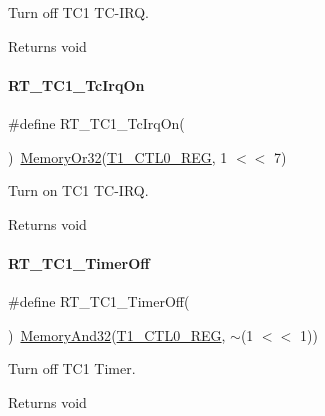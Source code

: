 Turn off T\+C1 T\+C-\/\+I\+RQ. 

\begin{DoxyReturn}{Returns}
void 
\end{DoxyReturn}
\mbox{\label{a00080_adbef657c94c7b32f07e4210fbf7f4745}} 
\paragraph{\texorpdfstring{R\+T\+\_\+\+T\+C1\+\_\+\+Tc\+Irq\+On}{RT\_TC1\_TcIrqOn}}
{\footnotesize\ttfamily \#define R\+T\+\_\+\+T\+C1\+\_\+\+Tc\+Irq\+On(\begin{DoxyParamCaption}{ }\end{DoxyParamCaption})~\mbox{\hyperlink{a00026_a27874a97deab7cecdde5ddecf466e31e}{Memory\+Or32}}(\mbox{\hyperlink{a00026_a55600694c3c73a1019f78d306f474fa1}{T1\+\_\+\+C\+T\+L0\+\_\+\+R\+EG}}, 1 $<$$<$ 7)}



Turn on T\+C1 T\+C-\/\+I\+RQ. 

\begin{DoxyReturn}{Returns}
void 
\end{DoxyReturn}
\mbox{\label{a00080_a1bccbc833364c4f1c6ce63a758136817}} 
\paragraph{\texorpdfstring{R\+T\+\_\+\+T\+C1\+\_\+\+Timer\+Off}{RT\_TC1\_TimerOff}}
{\footnotesize\ttfamily \#define R\+T\+\_\+\+T\+C1\+\_\+\+Timer\+Off(\begin{DoxyParamCaption}{ }\end{DoxyParamCaption})~\mbox{\hyperlink{a00026_ad87cedffcaadc51db22594fce55173d4}{Memory\+And32}}(\mbox{\hyperlink{a00026_a55600694c3c73a1019f78d306f474fa1}{T1\+\_\+\+C\+T\+L0\+\_\+\+R\+EG}}, $\sim$(1 $<$$<$ 1))}



Turn off T\+C1 Timer. 

\begin{DoxyReturn}{Returns}
void 
\end{DoxyReturn}
\mbox{\label{a00080_ac76393581e0b1d58a9628139db72cdaf}} 
